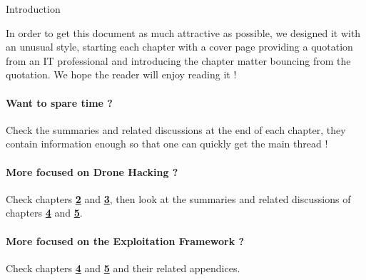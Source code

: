 \begin{chaptercover}{Introduction}
\begin{tip}
In order to get this document as much attractive as possible, we designed it with an unusual style, starting each chapter with a cover page providing a quotation from an IT professional and introducing the chapter matter bouncing from the quotation. We hope the reader will enjoy reading it !

\paragraph{Want to spare time ?} \hfill

Check the summaries and related discussions at the end of each chapter, they contain information enough so that one can quickly get the main thread !

\paragraph{More focused on Drone Hacking ?} \hfill

Check chapters \hyperref[background]{\color{FirstBlue}\bfseries 2} and \hyperref[scope]{\color{FirstBlue}\bfseries 3}, then look at the summaries and related discussions of chapters \hyperref[exploits]{\color{FirstBlue}\bfseries 4} and \hyperref[framework]{\color{FirstBlue}\bfseries 5}.

\paragraph{More focused on the Exploitation Framework ?} \hfill

Check chapters \hyperref[exploits]{\color{FirstBlue}\bfseries 4} and \hyperref[framework]{\color{FirstBlue}\bfseries 5} and their related appendices.
\end{tip}

\end{chaptercover}
